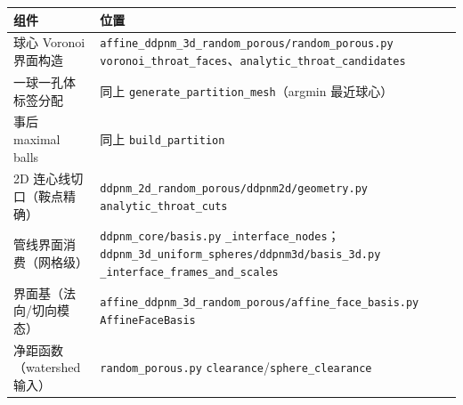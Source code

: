 \documentclass[11pt]{ctexart}
\begin{document}
\begin{center}
\small
\begin{tabular}{p{6.5cm}p{9cm}}
\toprule
组件 & 位置 \\
\midrule
球心 Voronoi 界面构造 &
\texttt{affine\_ddpnm\_3d\_random\_porous/random\_porous.py}
\texttt{voronoi\_throat\_faces}、\texttt{analytic\_throat\_candidates} \\
一球一孔体标签分配 & 同上 \texttt{generate\_partition\_mesh}（argmin 最近球心） \\
事后 maximal balls & 同上 \texttt{build\_partition} \\
2D 连心线切口（鞍点精确） &
\texttt{ddpnm\_2d\_random\_porous/ddpnm2d/geometry.py}
\texttt{analytic\_throat\_cuts} \\
管线界面消费（网格级） &
\texttt{ddpnm\_core/basis.py} \texttt{\_interface\_nodes}；
\texttt{ddpnm\_3d\_uniform\_spheres/ddpnm3d/basis\_3d.py}
\texttt{\_interface\_frames\_and\_scales} \\
界面基（法向/切向模态） &
\texttt{affine\_ddpnm\_3d\_random\_porous/affine\_face\_basis.py}
\texttt{AffineFaceBasis} \\
净距函数（watershed 输入） &
\texttt{random\_porous.py} \texttt{clearance}/\texttt{sphere\_clearance} \\
\bottomrule
\end{tabular}
\end{center}
\end{document}
